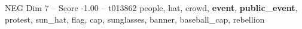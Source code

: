 \begin{textsample}{NEG Dim 7 – Score -1.00 – t013862}  \label{ex:f7_neg_011}
people, hat, crowd, \textbf{event}, \textbf{public\_event}, protest, sun\_hat, flag, cap, sunglasses, banner, baseball\_cap, rebellion

\end{textsample}
